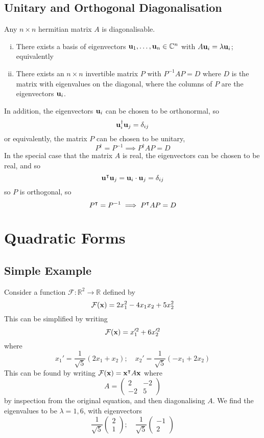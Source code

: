 \documentclass{article}
\begin{document}
\subsection{Unitary and Orthogonal Diagonalisation}
\begin{theorem}
	Any $n\times n$ hermitian matrix $A$ is diagonalisable.
	\begin{enumerate}[(i)]
		\item There exists a basis of eigenvectors $\vb u_1, \dots, \vb u_n \in \mathbb C^n$ with $A\vb u_i = \lambda \vb u_i$; equivalently
		\item There exists an $n \times n$ invertible matrix $P$ with $P^{-1}AP = D$ where $D$ is the matrix with eigenvalues on the diagonal, where the columns of $P$ are the eigenvectors $\vb u_i$.
	\end{enumerate}
	In addition, the eigenvectors $\vb u_i$ can be chosen to be orthonormal, so
	\[ \vb u^\dagger_i \vb u_j = \delta_{ij} \]
	or equivalently, the matrix $P$ can be chosen to be unitary,
	\[ P^\dagger = P^{-1} \implies P^\dagger AP = D \]
	In the special case that the matrix $A$ is real, the eigenvectors can be chosen to be real, and so
	\[ \vb u^\intercal \vb u_j = \vb u_i \cdot \vb u_j = \delta_{ij} \]
	so $P$ is orthogonal, so
	\[ P^\intercal = P^{-1} \implies P^\intercal AP = D \]
\end{theorem}

\section{Quadratic Forms}
\subsection{Simple Example}
Consider a function $\mathcal F\colon \mathbb R^2 \to \mathbb R$ defined by
\[ \mathcal F(\vb x) = 2x_1^2 - 4x_1x_2 + 5x_2^2 \]
This can be simplified by writing
\[ \mathcal F(\vb x) = x_1'^2 + 6x_2'^2 \]
where
\[ x_1' = \frac{1}{\sqrt 5}(2x_1 + x_2);\quad x_2' = \frac{1}{\sqrt 5}(-x_1 + 2x_2) \]
This can be found by writing $\mathcal F(\vb x) = \vb x^\intercal A\vb x$ where
\[ A = \begin{pmatrix}
		2 & -2 \\ -2 & 5
	\end{pmatrix} \]
by inspection from the original equation, and then diagonalising $A$. We find the eigenvalues to be $\lambda = 1, 6$, with eigenvectors
\[ \frac{1}{\sqrt 5} \begin{pmatrix}
		2 \\ 1
	\end{pmatrix};\quad \frac{1}{\sqrt 5}\begin{pmatrix}
		-1 \\ 2
	\end{pmatrix} \]
\end{document}
